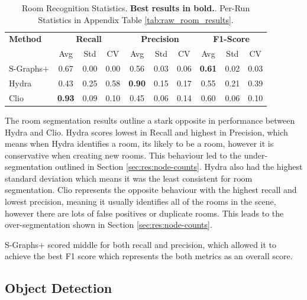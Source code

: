 \begin{table}[H]
\centering
\caption{Room Recognition Statistics. \textbf{Best results in bold.}. Per-Run Statistics in Appendix Table \ref{tab:raw_room_results}.}
\label{tab:room_recognition_transposed}
\begin{tabular}{l | ccc | ccc | ccc}
\toprule
\textbf{Method} & \multicolumn{3}{c|}{\textbf{Recall}} & \multicolumn{3}{c|}{\textbf{Precision}} & \multicolumn{3}{c}{\textbf{F1-Score}} \\
 & Avg & Std & CV & Avg & Std & CV & Avg & Std & CV \\
\midrule
S-Graphs+ & 0.67 & 0.00 & 0.00 & 0.56 & 0.03 & 0.06 & \textbf{0.61} & 0.02 & 0.03 \\
Hydra     & 0.43 & 0.25 & 0.58 & \textbf{0.90} & 0.15 & 0.17 & 0.55 & 0.21 & 0.39 \\
Clio      & \textbf{0.93} & 0.09 & 0.10 & 0.45 & 0.06 & 0.14 & 0.60 & 0.06 & 0.10 \\
\bottomrule
\end{tabular}
\end{table}

The room segmentation results outline a stark opposite in performance between Hydra and Clio. Hydra scores lowest in Recall and highest in Precision, which means when Hydra identifies a room, its likely to be a room, however it is conservative when creating new rooms. This behaviour led to the under-segmentation outlined in Section \ref{sec:res:node-counts}. Hydra also had the highest standard deviation which means it was the least consistent for room segmentation. Clio represents the opposite behaviour with the highest recall and lowest precision, meaning it usually identifies all of the rooms in the scene, however there are lots of false positives or duplicate rooms. This leads to the over-segmentation shown in Section \ref{sec:res:node-counts}.

S-Graphs+ scored middle for both recall and precision, which allowed it to achieve the best F1 score which represents the both metrics as an overall score.

\subsection{Object Detection}\label{sec:res:objects}

